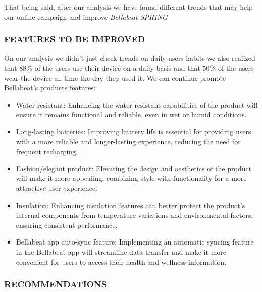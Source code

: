\documentclass[
]{article}
\providecommand{\tightlist}{%
  \setlength{\itemsep}{0pt}\setlength{\parskip}{0pt}}
\begin{document}
That being said, after our analysis we have found different trends that
may help our online campaign and improve \emph{Bellabeat SPRING}

\hypertarget{features-to-be-improved}{%
\subsubsection{FEATURES TO BE IMPROVED}\label{features-to-be-improved}}

On our analysis we didn't just check trends on daily users habits we
also realized that 88\% of the users use their device on a daily basis
and that 50\% of the users wear the device all time the day they used
it. We can continue promote Bellabeat's products features:

\begin{itemize}
\tightlist
\item
  Water-resistant: Enhancing the water-resistant capabilities of the
  product will ensure it remains functional and reliable, even in wet or
  humid conditions.
\item
  Long-lasting batteries: Improving battery life is essential for
  providing users with a more reliable and longer-lasting experience,
  reducing the need for frequent recharging.
\item
  Fashion/elegant product: Elevating the design and aesthetics of the
  product will make it more appealing, combining style with
  functionality for a more attractive user experience.
\item
  Insulation: Enhancing insulation features can better protect the
  product's internal components from temperature variations and
  environmental factors, ensuring consistent performance.
\item
  Bellabeat app auto-sync feature: Implementing an automatic syncing
  feature in the Bellabeat app will streamline data transfer and make it
  more convenient for users to access their health and wellness
  information.
\end{itemize}

\hypertarget{recommendations}{%
\subsubsection{RECOMMENDATIONS}\label{recommendations}}
\end{document}
